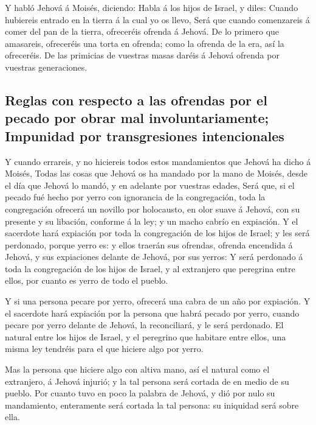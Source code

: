  Y habló Jehová á Moisés, diciendo:  Habla
á los hijos de Israel, y diles: Cuando hubiereis entrado en la tierra á
la cual yo os llevo,  Será que cuando comenzareis á comer
del pan de la tierra, ofreceréis ofrenda á Jehová.  De lo
primero que amasareis, ofreceréis una torta en ofrenda; como la ofrenda
de la era, así la ofreceréis.  De las primicias de
vuestras masas daréis á Jehová ofrenda por vuestras generaciones.

\hypertarget{reglas-con-respecto-a-las-ofrendas-por-el-pecado-por-obrar-mal-involuntariamente-impunidad-por-transgresiones-intencionales}{%
\subsection{Reglas con respecto a las ofrendas por el pecado por obrar
mal involuntariamente; Impunidad por transgresiones
intencionales}\label{reglas-con-respecto-a-las-ofrendas-por-el-pecado-por-obrar-mal-involuntariamente-impunidad-por-transgresiones-intencionales}}

 Y cuando errareis, y no hiciereis todos estos
mandamientos que Jehová ha dicho á Moisés,  Todas las
cosas que Jehová os ha mandado por la mano de Moisés, desde el día que
Jehová lo mandó, y en adelante por vuestras edades,  Será
que, si el pecado fué hecho por yerro con ignorancia de la congregación,
toda la congregación ofrecerá un novillo por holocausto, en olor suave á
Jehová, con su presente y su libación, conforme á la ley; y un macho
cabrío en expiación.  Y el sacerdote hará expiación por
toda la congregación de los hijos de Israel; y les será perdonado,
porque yerro es: y ellos traerán sus ofrendas, ofrenda encendida á
Jehová, y sus expiaciones delante de Jehová, por sus yerros:
 Y será perdonado á toda la congregación de los hijos de
Israel, y al extranjero que peregrina entre ellos, por cuanto es yerro
de todo el pueblo.

 Y si una persona pecare por yerro, ofrecerá una cabra de
un año por expiación.  Y el sacerdote hará expiación por
la persona que habrá pecado por yerro, cuando pecare por yerro delante
de Jehová, la reconciliará, y le será perdonado.  El
natural entre los hijos de Israel, y el peregrino que habitare entre
ellos, una misma ley tendréis para el que hiciere algo por yerro.

 Mas la persona que hiciere algo con altiva mano, así el
natural como el extranjero, á Jehová injurió; y la tal persona será
cortada de en medio de su pueblo.  Por cuanto tuvo en
poco la palabra de Jehová, y dió por nulo su mandamiento, enteramente
será cortada la tal persona: su iniquidad será sobre ella.

